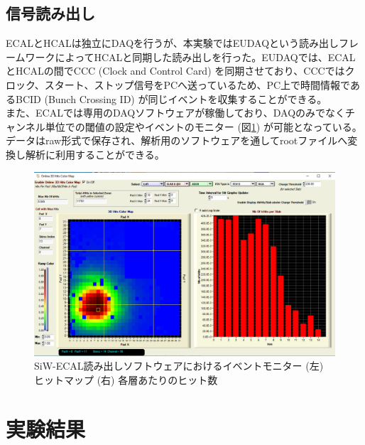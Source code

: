 \subsection{信号読み出し}
ECALとHCALは独立にDAQを行うが、本実験ではEUDAQという読み出しフレームワークによってHCALと同期した読み出しを行った。EUDAQでは、ECALとHCALの間でCCC (Clock and Control Card) を同期させており、CCCではクロック、スタート、ストップ信号をPCへ送っているため、PC上で時間情報であるBCID (Bunch Crossing ID) が同じイベントを収集することができる。\\
また、ECALでは専用のDAQソフトウェア\cite{ecalsoft}が稼働しており、DAQのみでなくチャンネル単位での閾値の設定やイベントのモニター (図\ref{monitor}) が可能となっている。データはraw形式で保存され、解析用のソフトウェアを通してrootファイルへ変換し解析に利用することができる。
\begin{figure}[H]
\begin{center}
 \includegraphics[keepaspectratio, scale=0.2]
 	{Figure/Beamtest/monitor.png}
 		\caption{SiW-ECAL読み出しソフトウェアにおけるイベントモニター (左) ヒットマップ (右) 各層あたりのヒット数}
		\label{monitor}
\end{center}
\end{figure}
\section{実験結果}
